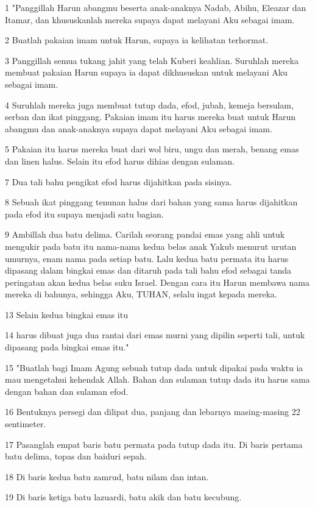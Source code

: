 \par 1 "Panggillah Harun abangmu beserta anak-anaknya Nadab, Abihu, Eleazar dan Itamar, dan khususkanlah mereka supaya dapat melayani Aku sebagai imam.
\par 2 Buatlah pakaian imam untuk Harun, supaya ia kelihatan terhormat.
\par 3 Panggillah semua tukang jahit yang telah Kuberi keahlian. Suruhlah mereka membuat pakaian Harun supaya ia dapat dikhususkan untuk melayani Aku sebagai imam.
\par 4 Suruhlah mereka juga membuat tutup dada, efod, jubah, kemeja bersulam, serban dan ikat pinggang. Pakaian imam itu harus mereka buat untuk Harun abangmu dan anak-anaknya supaya dapat melayani Aku sebagai imam.
\par 5 Pakaian itu harus mereka buat dari wol biru, ungu dan merah, benang emas dan linen halus. Selain itu efod harus dihias dengan sulaman.
\par 7 Dua tali bahu pengikat efod harus dijahitkan pada sisinya.
\par 8 Sebuah ikat pinggang tenunan halus dari bahan yang sama harus dijahitkan pada efod itu supaya menjadi satu bagian.
\par 9 Ambillah dua batu delima. Carilah seorang pandai emas yang ahli untuk mengukir pada batu itu nama-nama kedua belas anak Yakub menurut urutan umurnya, enam nama pada setiap batu. Lalu kedua batu permata itu harus dipasang dalam bingkai emas dan ditaruh pada tali bahu efod sebagai tanda peringatan akan kedua belas suku Israel. Dengan cara itu Harun membawa nama mereka di bahunya, sehingga Aku, TUHAN, selalu ingat kepada mereka.
\par 13 Selain kedua bingkai emas itu
\par 14 harus dibuat juga dua rantai dari emas murni yang dipilin seperti tali, untuk dipasang pada bingkai emas itu."
\par 15 "Buatlah bagi Imam Agung sebuah tutup dada untuk dipakai pada waktu ia mau mengetahui kehendak Allah. Bahan dan sulaman tutup dada itu harus sama dengan bahan dan sulaman efod.
\par 16 Bentuknya persegi dan dilipat dua, panjang dan lebarnya masing-masing 22 sentimeter.
\par 17 Pasanglah empat baris batu permata pada tutup dada itu. Di baris pertama batu delima, topas dan baiduri sepah.
\par 18 Di baris kedua batu zamrud, batu nilam dan intan.
\par 19 Di baris ketiga batu lazuardi, batu akik dan batu kecubung.
